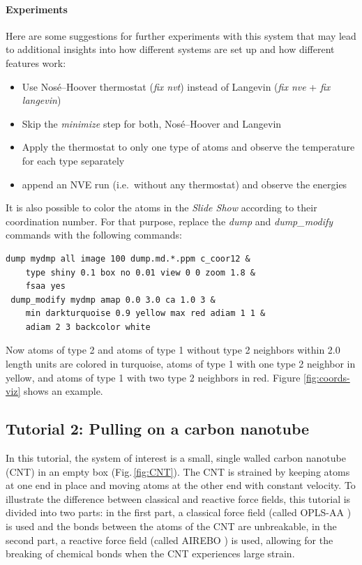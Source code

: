 \documentclass[9pt,tutorial]{livecoms}
\begin{document}
\paragraph{Experiments}

Here are some suggestions for further experiments with this system that
may lead to additional insights into how different systems are set up
and how different features work:
\begin{itemize}
\item Use Nos\'e--Hoover thermostat (\textit{fix nvt}) instead of Langevin
  (\textit{fix nve} + \textit{fix langevin})
\item Skip the \textit{minimize} step for both, Nos\'e--Hoover and Langevin
\item Apply the thermostat to only one type of atoms and observe the
  temperature for each type separately
\item append an NVE run (i.e.~without any thermostat) and observe the energies
\end{itemize}

It is also possible to color the atoms in the \textit{Slide Show}
according to their coordination number. For that purpose, replace the
\textit{dump} and \textit{dump\_modify} commands with the following
commands:
\begin{lstlisting}
dump mydmp all image 100 dump.md.*.ppm c_coor12 &
    type shiny 0.1 box no 0.01 view 0 0 zoom 1.8 &
    fsaa yes
 dump_modify mydmp amap 0.0 3.0 ca 1.0 3 &
    min darkturquoise 0.9 yellow max red adiam 1 1 &
    adiam 2 3 backcolor white
\end{lstlisting}

Now atoms of type 2 and atoms of type 1 without type 2 neighbors
within 2.0 length units are colored in turquoise, atoms of type 1 with
one type 2 neighbor in yellow, and atoms of type 1 with two type 2
neighbors in red.  Figure \ref{fig:coords-viz} shows an example.

\subsection{Tutorial 2: Pulling on a carbon nanotube}
\label{carbon-nanotube-label}

In this tutorial, the system of interest is a small, single walled
carbon nanotube (CNT) in an empty box (Fig.\,\ref{fig:CNT}).  The CNT is
strained by keeping atoms at one end in place and moving atoms at the
other end with constant velocity.  To illustrate the difference between
classical \cite{typelabel_paper} and reactive force fields, this
tutorial is divided into two parts: in the first part, a classical force
field (called OPLS-AA \cite{jorgensenDevelopmentTestingOPLS1996}) is
used and the bonds between the atoms of the CNT are unbreakable, in the
second part, a reactive force field (called AIREBO
\cite{stuart2000reactive}) is used, allowing for the breaking of
chemical bonds when the CNT experiences large strain.
\end{document}
